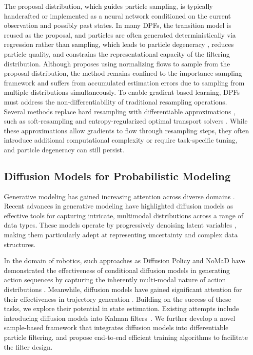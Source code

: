 The proposal distribution, which guides particle sampling, is typically handcrafted \cite{le2018auto, naesseth2018variational} or implemented as a neural network conditioned on the current observation and possibly past states. In many DPFs, the transition model is reused as the proposal, and particles are often generated deterministically via regression rather than sampling, which leads to particle degeneracy \cite{bickel2008sharp}, reduces particle quality, and constrains the representational capacity of the filtering distribution. Although \cite{chen2024normalizing} proposes using normalizing flows to sample from the proposal distribution, the method remains confined to the importance sampling framework and suffers from accumulated estimation errors due to sampling from multiple distributions simultaneously.
To enable gradient-based learning, DPFs must address the non-differentiability of traditional resampling operations. Several methods replace hard resampling with differentiable approximations \cite{zhu2020towards}, such as soft-resampling \cite{karkus2018particle} and entropy-regularized optimal transport solvers \cite{corenflos2021differentiable}. While these approximations allow gradients to flow through resampling steps, they often introduce additional computational complexity or require task-specific tuning, and particle degeneracy can still persist.

\subsection{Diffusion Models for Probabilistic Modeling}
Generative modeling has gained increasing attention across diverse domains \cite{liu2025filtersallgeneralistfilter, lind2025normalizingflowscapablevisuomotor}. Recent advances in generative modeling have highlighted diffusion models as effective tools for capturing intricate, multimodal distributions across a range of data types. These models operate by progressively denoising latent variables \cite{sohl2015deep, ho2020denoising}, making them particularly adept at representing uncertainty and complex data structures.

In the domain of robotics, such approaches as Diffusion Policy \cite{chi2023diffusion} and NoMaD \cite{sridhar2024nomad} have demonstrated the effectiveness of conditional diffusion models in generating action sequences by capturing the inherently multi-modal nature of action distributions \cite{wang2022diffusion}. Meanwhile, diffusion models have gained significant attention for their effectiveness in trajectory generation \cite{carvalho2023motion, liang2023adaptdiffuser}. 
Building on the success of these tasks, we explore their potential in state estimation. Existing attempts include introducing diffusion models into Kalman filters~\cite{wan2025dnd}. We further develop a novel sample-based framework that integrates diffusion models into differentiable particle filtering, and propose end-to-end efficient training algorithms to facilitate the filter design. 
  
